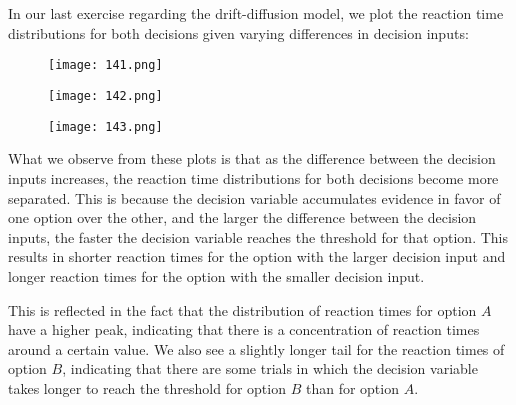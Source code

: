 \documentclass{article}
\begin{document}
\section{}

In our last exercise regarding the drift-diffusion model, we plot the reaction time distributions for both decisions given varying differences in decision inputs:

\begin{figure}[ht]
    \centering
    \begin{minipage}{0.3\textwidth}
        \centering
        \texttt{[image: 141.png]} 
    \end{minipage}\hfill
    \begin{minipage}{0.3\textwidth}
        \centering
        \texttt{[image: 142.png]}
    \end{minipage}\hfill
    \begin{minipage}{0.3\textwidth}
        \centering
        \texttt{[image: 143.png]}
    \end{minipage}
\end{figure}

\FloatBarrier
What we observe from these plots is that as the difference between the decision inputs increases, the reaction time distributions for both decisions become more separated. This is because the decision variable accumulates evidence in favor of one option over the other, and the larger the difference between the decision inputs, the faster the decision variable reaches the threshold for that option. This results in shorter reaction times for the option with the larger decision input and longer reaction times for the option with the smaller decision input. 
\vspace{1em}

This is reflected in the fact that the distribution of reaction times for option $A$ have a higher peak, indicating that there is a concentration of reaction times around a certain value. We also see a slightly longer tail for the reaction times of option $B$, indicating that there are some trials in which the decision variable takes longer to reach the threshold for option $B$ than for option $A$.
\newpage



\setcounter{section}{0}
\renewcommand{\thesection}{2.\arabic{section}}

\section{}
\end{document}
